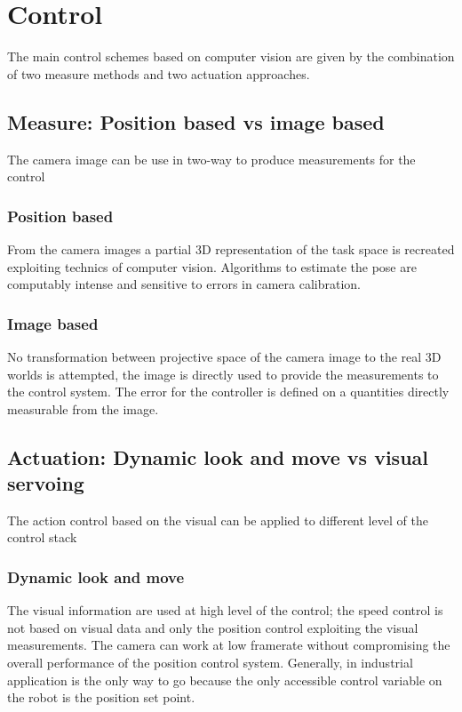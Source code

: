 \section{Control}

The main control schemes based on computer vision are given by the combination of two measure methods and two actuation approaches.

\subsection{Measure: Position based vs image based}

The camera image can be use in two-way to produce measurements for the control

\subsubsection{Position based}

From the camera images a partial 3D representation of the task space is recreated exploiting technics of computer vision.
Algorithms to estimate the pose are computably intense and sensitive to errors in camera calibration.

\subsubsection{Image based}

No transformation between projective space of the camera image to the real 3D worlds is attempted, the image is directly used to provide the measurements to the control system.
The error for the controller is defined on a quantities directly measurable from the image.

\subsection{Actuation: Dynamic look and move vs visual servoing}

The action control based on the visual can be applied to different level of the control stack

\subsubsection{Dynamic look and move}

The visual information are used at high level of the control;
the speed control is not based on visual data and only the position control exploiting the visual measurements.
The camera can work at low framerate without compromising the overall performance of the position control system.
Generally, in industrial application is the only way to go because the only accessible control variable on the robot is the position set point.

